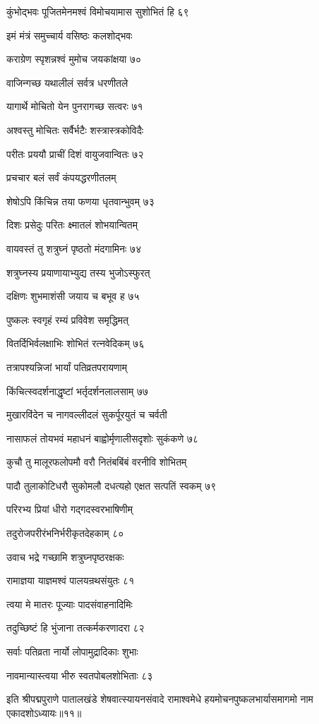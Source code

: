 कुंभोद्भवः पूजितमेनमश्वं विमोचयामास सुशोभितं हि ६९

इमं मंत्रं समुच्चार्य वसिष्ठः कलशोद्भवः

कराग्रेण स्पृशन्नश्वं मुमोच जयकांक्षया ७०

वाजिन्गच्छ यथालीलं सर्वत्र धरणीतले

यागार्थे मोचितो येन पुनरागच्छ सत्वरः ७१

अश्वस्तु मोचितः सर्वैर्भटैः शस्त्रास्त्रकोविदैः

परीतः प्रययौ प्राचीं दिशं वायुजवान्वितः ७२

प्रचचार बलं सर्वं कंपयद्धरणीतलम्

शेषोऽपि किंचिन्न तया फणया धृतवान्भुवम् ७३

दिशः प्रसेदुः परितः क्ष्मातलं शोभयान्वितम्

वायवस्तं तु शत्रुघ्नं पृष्ठतो मंदगामिनः ७४

शत्रुघ्नस्य प्रयाणायाभ्युद्य तस्य भुजोऽस्फुरत्

दक्षिणः शुभमाशंसी जयाय च बभूव ह ७५

पुष्कलः स्वगृहं रम्यं प्रविवेश समृद्धिमत्

वितर्दिभिर्वलक्षाभिः शोभितं रत्नवेदिकम् ७६

तत्रापश्यन्निजां भार्यां पतिव्रतपरायणाम्

किंचित्स्वदर्शनाद्धृष्टां भर्तृदर्शनलालसाम् ७७

मुखारविंदेन च नागवल्लीदलं सुकर्पूरयुतं च चर्वती

नासाफलं तोयभवं महाधनं बाह्वोर्मृणालीसदृशोः सुकंकणे ७८

कुचौ तु मालूरफलोपमौ वरौ नितंबबिंबं वरनीवि शोभितम्

पादौ तुलाकोटिधरौ सुकोमलौ दधत्यहो एक्षत सत्पतिं स्वकम् ७९

परिरभ्य प्रियां धीरो गद्गदस्वरभाषिणीम्

तदुरोजपरीरंभनिर्भरीकृतदेहकाम् ८०

उवाच भद्रे गच्छामि शत्रुघ्नपृष्ठरक्षकः

रामाज्ञया याज्ञमश्वं पालयन्रथसंयुतः ८१

त्वया मे मातरः पूज्याः पादसंवाहनादिमिः

तदुच्छिष्टं हि भुंजाना तत्कर्मकरणादरा ८२

सर्वाः पतिव्रता नार्यो लोपामुद्रादिकाः शुभाः

नावमान्यास्त्वया भीरु स्वतपोबलशोभिताः ८३

इति श्रीपद्मपुराणे पातालखंडे शेषवात्स्यायनसंवादे रामाश्वमेधे हयमोचनपुष्कलभार्यासमागमो नाम एकादशोऽध्यायः॥११॥


